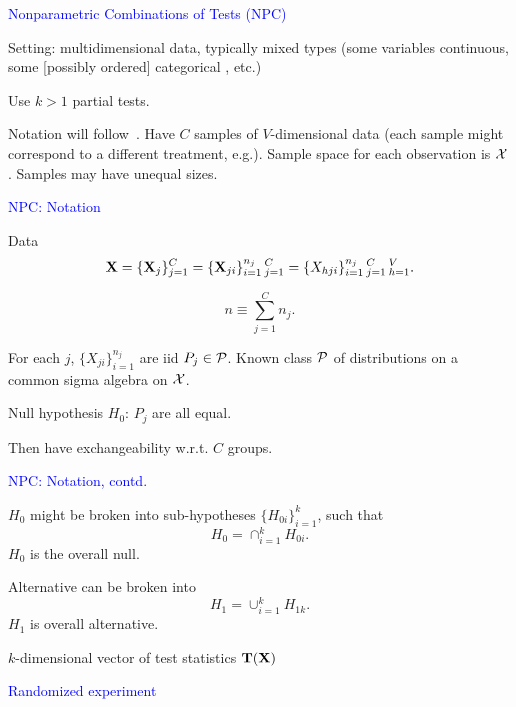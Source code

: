 \documentclass[landscape]{slides}
\newcommand{\cP}{{\cal P}}
\newcommand{\cX}{{\cal X}}
\newcommand{\bfT}{{\bf T}}
\newcommand{\bfX}{{\bf X}}
\newcommand{\beq}{\begin{equation}}
\newcommand{\eeq}{\end{equation}}
\begin{document}
\begin{slide}
\begin{slide}
{\textcolor{blue}{Nonparametric Combinations of Tests (NPC)}}

Setting: multidimensional data, typically mixed types (some variables
continuous, some [possibly ordered] categorical , etc.)

Use $k > 1$ partial tests.

Notation will follow~\cite{pesarinSalmaso10}.  
Have $C$ samples of $V$-dimensional data
(each sample might correspond to a different treatment, e.g.).
Sample space for each observation is $\cX$.
Samples may have unequal sizes.

\end{slide}

\begin{slide}
{\textcolor{blue}{NPC: Notation}}

Data
\beq
  \bfX = \{ \bfX_j \}_{j=1}^C = \{ \bfX_{ji} \}_{i=1}^{n_j}{\,}_{j=1}^C =
  \{ X_{hji} \}_{i=1}^{n_j}{\,}_{j=1}^C{\,}_{h=1}^V.
\eeq

\beq
   n \equiv \sum_{j=1}^C n_j.
\eeq

For each $j$, $\{ X_{ji} \}_{i=1}^{n_j}$ are iid $P_j \in \cP$.  Known class $\cP$ of distributions
on a common sigma algebra on $\cX$.

Null hypothesis $H_0$:  $P_j$ are all equal.

Then have exchangeability w.r.t. $C$ groups.

\end{slide}

\begin{slide}
{\textcolor{blue}{NPC: Notation, contd.}}

$H_0$ might be broken into sub-hypotheses $\{H_{0i}\}_{i=1}^k$, such that
\beq
    H_0 = \cap_{i=1}^k H_{0i}.
\eeq
$H_0$ is the overall null.

Alternative can be broken into
\beq
   H_1 = \cup_{i=1}^k H_{1k}.
\eeq
$H_1$ is overall alternative.

$k$-dimensional vector of test statistics $\bfT(\bfX)$

\end{slide}


\begin{slide}
{\textcolor{blue}{Randomized experiment}}


\end{slide}
\end{slide}
\end{document}
